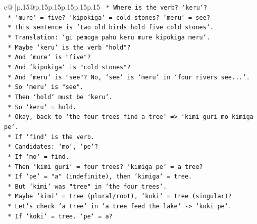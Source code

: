 \documentclass{article}
\begin{document}
{\begin{supertabular}{c@{$\;$}|p{.15\linewidth}@{}p{.15\linewidth}p{.15\linewidth}p{.15\linewidth}p{.15\linewidth}p{.15\linewidth}}
{{{\texttt{                                *   Where is the verb? `keru`?} \\
\texttt{                                *   `mure` = five? `kipokiga` = cold stones? `meru` = see?} \\
\texttt{                                *   This sentence is `two old birds hold five cold stones`.} \\
\texttt{                                *   Translation: `gi pemoga pahu keru mure kipokiga meru`.} \\
\texttt{                                *   Maybe `keru` is the verb "hold"?} \\
\texttt{                                *   And `mure` is "five"?} \\
\texttt{                                *   And `kipokiga` is "cold stones"?} \\
\texttt{                                *   And `meru` is "see"? No, `see` is `meru` in `four rivers see...`.} \\
\texttt{                                *   So `meru` is "see".} \\
\texttt{                                *   Then `hold` must be `keru`.} \\
\texttt{                                *   So `keru` = hold.} \\
\texttt{                            *   Okay, back to `the four trees find a tree` => `kimi guri mo kimiga pe`.} \\
\texttt{                                *   If `find` is the verb.} \\
\texttt{                                *   Candidates: `mo`, `pe`?} \\
\texttt{                                *   If `mo` = find.} \\
\texttt{                                *   Then `kimi guri` = four trees? `kimiga pe` = a tree?} \\
\texttt{                                *   If `pe` = "a" (indefinite), then `kimiga` = tree.} \\
\texttt{                                *   But `kimi` was "tree" in `the four trees`.} \\
\texttt{                                *   Maybe `kimi` = tree (plural/root), `koki` = tree (singular)?} \\
\texttt{                                *   Let's check `a tree` in `a tree feed the lake` {-}> `koki pe`.} \\
\texttt{                                *   If `koki` = tree. `pe` = a?} \\
}}}
\end{supertabular}}
\end{document}
